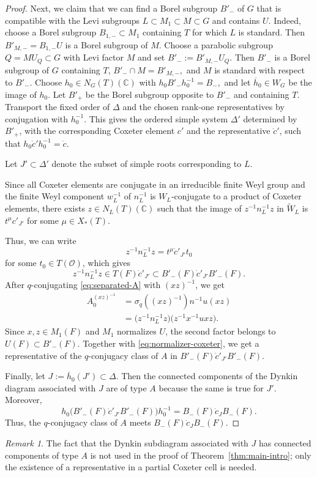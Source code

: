 \documentclass[11pt]{amsart}
\numberwithin{equation}{section}
\theoremstyle{definition}
\theoremstyle{remark}
\newtheorem{remark}[remark]{Remark}
\begin{document}
\begin{proof}
Next, we claim that we can find a Borel subgroup $B'_{-}$ of $G$ that is compatible with the Levi subgroups $L\subset M_1\subset M\subset G$ and contains $U$. Indeed, choose a Borel subgroup $B_{1,-}\subset M_1$ containing $T$ for which $L$
is standard. Then $B'_{M,-}=B_{1,-}U$ is a Borel subgroup of $M$.  Choose a parabolic subgroup $Q=MU_Q\subset G$ with Levi factor $M$ and set $ B'_-:=B'_{M,-}U_Q.$ Then $B'_-$ is a Borel subgroup of $G$ containing $T$, $ B'_-\cap M=B'_{M,-},$ and $M$ is standard with respect to $B'_-.$   Choose $h_0\in N_G(T)(\mathbb C)$ with $ h_0B'_-h_0^{-1}=B_-,$ and let $\overline h_0\in W_G$ be the image of $h_0$.  Let $B'_+$ be the Borel subgroup opposite to $B'_-$ and containing $T$.  Transport the fixed order of $\Delta$ and the chosen rank-one representatives by conjugation
with $h_0^{-1}$.  This gives the ordered simple system $\Delta'$ determined by $B'_+$, with the corresponding Coxeter element $c'$ and the representative
$\dot c'$, such that $h_0\dot c'h_0^{-1}=\dot c.$

Let $J'\subset\Delta'$ denote the subset of simple roots corresponding to $L$.

Since all Coxeter elements are conjugate in an irreducible finite Weyl group \cite[Section~3.16]{HumphreysCoxeter} and the finite Weyl component $w_L^{-1}$ of $n_L^{-1}$ is
$W_L$-conjugate to a product of Coxeter elements, there exists
$z\in N_L(T)(\mathbb C)$ such that the image of
$z^{-1}n_L^{-1}z$ in $\widetilde W_L$ is $ t^\mu c'_{J'}$
for some $\mu\in X_*(T)$.

Thus, we can write
\[
  z^{-1}n_L^{-1}z=t^\mu\dot c'_{J'}t_0
\]
for some $t_0\in T(\mathcal O)$, which gives
\begin{equation}\label{eq:normalizer-coxeter}
  z^{-1}n_L^{-1}z
  \in T(F)\dot c'_{J'}
  \subset B'_-(F)\dot c'_{J'}B'_-(F).
\end{equation}
After $q$-conjugating \eqref{eq:separated-A} with $(xz)^{-1}$, we get
\begin{align*}
  A_0^{(xz)^{-1}}
  &=\sigma_q((xz)^{-1})n^{-1}u(xz)\\
  &=\bigl(z^{-1}n_L^{-1}z\bigr)
    \bigl(z^{-1}x^{-1}uxz\bigr).
\end{align*}
Since $x,z\in M_1(F)$ and $M_1$ normalizes $U$,
the second factor belongs to $U(F)\subset B'_-(F)$.
Together with \eqref{eq:normalizer-coxeter}, we get a representative of the $q$-conjugacy class of $A$ in
$B'_-(F)\dot c'_{J'}B'_-(F)$.

Finally, let $ J:=\overline h_0(J')\subset\Delta.$
Then the connected components of the Dynkin diagram associated with $J$ are of type $A$ because the same is true for $J'$. Moreover,
\[
  h_0\bigl(B'_-(F)\dot c'_{J'}B'_-(F)\bigr)h_0^{-1}
  =B_-(F)\dot c_JB_-(F).
\]
Thus, the $q$-conjugacy class of $A$ meets $ B_-(F)\dot c_JB_-(F).$
\end{proof}
\begin{remark}
    The fact that the Dynkin subdiagram associated with $J$ has connected components of type $A$ is not used in the proof of Theorem~\ref{thm:main-intro}; only the existence of a representative in a partial Coxeter cell is needed.
\end{remark}
\end{document}
